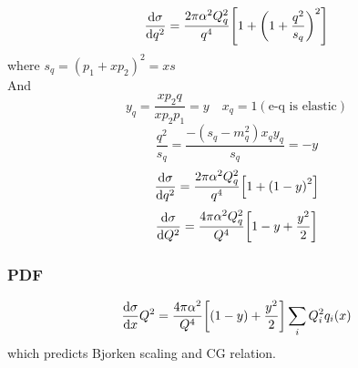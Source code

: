 \documentclass[a4paper]{article}
\numberwithin{equation}{section}
\begin{document}
\begin{equation}\label{key}
\dv{\sigma}{q^2} = \dfrac{2\pi\alpha^2 Q_q^2}{q^4}\qty[1 + \qty(1 + \dfrac{q^2}{s_q})^2]
\end{equation}
where $ s_q = (p_1 + xp_2)^2 = xs $\\
And 
\begin{equation}\label{key}
y_q = \dfrac{xp_2 q}{xp_2 p_1} = y \quad x_q = 1 (\text{e-q is elastic})
\end{equation}
\begin{equation}\label{key}
\dfrac{q^2}{s_q} = \dfrac{-(s_q - m_q^2)x_q y_q}{s_q} = -y
\end{equation}
\begin{equation}\label{key}
\dv{\sigma}{q^2} = \dfrac{2\pi\alpha^2 Q_q^2}{q^4}\qty[1 + \qty(1 - y)^2]
\end{equation}
\begin{equation}\label{key}
\dv{\sigma}{Q^2} = \dfrac{4\pi\alpha^2 Q_q^2}{Q^4}\qty[1 - y + \dfrac{y^2}{2}]
\end{equation}

\subsubsection{PDF}
\begin{equation}\label{key}
\dv{\sigma}{x}{Q^2} = \dfrac{4\pi\alpha^2}{Q^4}\qty[(1-y) + \dfrac{y^2}{2}]\sum_i Q_i^2 q_i(x)
\end{equation}
which predicts Bjorken scaling and CG relation.\\
\end{document}
